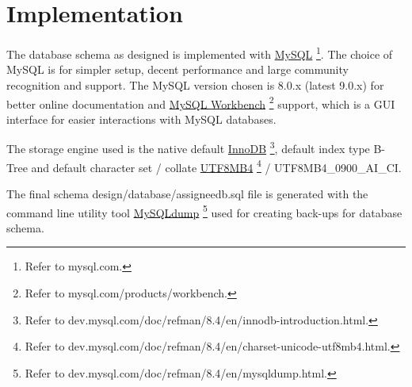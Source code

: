 \documentclass[12pt]{report}
\newcommand{\n}{\par}
\begin{document}
\section{Implementation} \label{data-layer.implementation}
The database schema as designed is implemented with \href{https://www.mysql.com}{MySQL}
\footnote{Refer to mysql.com.}.
The choice of MySQL is for simpler setup, decent performance and large community recognition and support.
The MySQL version chosen is 8.0.x (latest 9.0.x) for better online documentation and
\href{https://www.mysql.com/products/workbench}{MySQL Workbench} \footnote{Refer to mysql.com/products/workbench.}
support, which is a GUI interface for easier interactions with MySQL databases.\n
The storage engine used is the native default \href{https://dev.mysql.com/doc/refman/8.4/en/innodb-introduction.html}{InnoDB}
\footnote{Refer to dev.mysql.com/doc/refman/8.4/en/innodb-introduction.html.},
default index type B-Tree and
default character set / collate
\href{https://dev.mysql.com/doc/refman/8.4/en/charset-unicode-utf8mb4.html}{UTF8MB4}
\footnote{Refer to dev.mysql.com/doc/refman/8.4/en/charset-unicode-utf8mb4.html.}
/ UTF8MB4\_0900\_AI\_CI.\n
The final schema design/database/assigneedb.sql file is generated with the command line utility tool
\href{https://dev.mysql.com/doc/refman/8.4/en/mysqldump.html}{MySQLdump}
\footnote{Refer to dev.mysql.com/doc/refman/8.4/en/mysqldump.html.}
used for creating back-ups for database schema.









\end{document}

